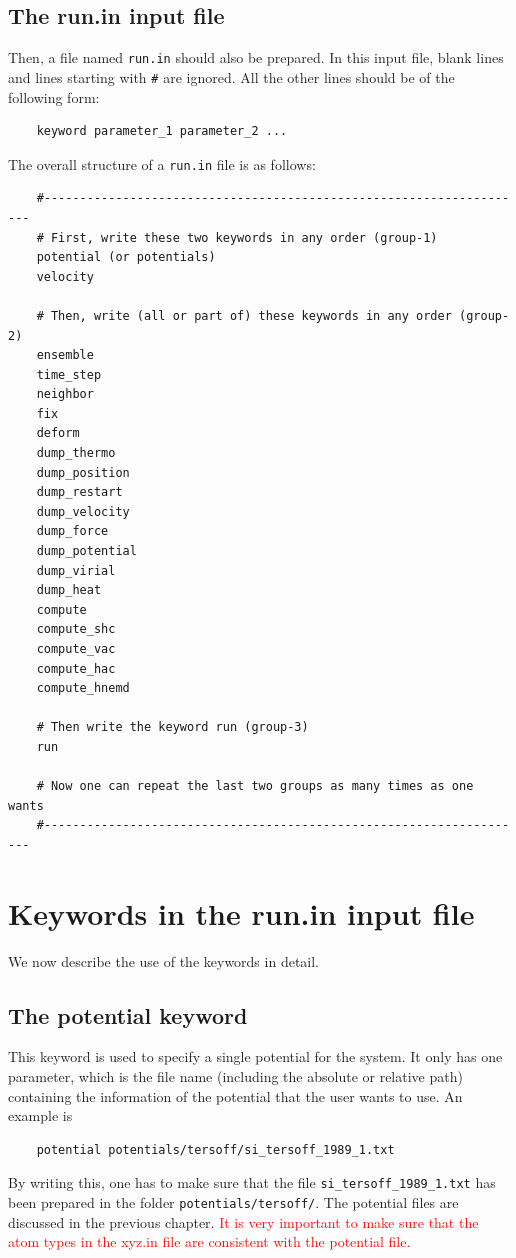 \documentclass[12pt,a4paper]{report}
\begin{document}
\subsection{The run.in input file}

Then, a file named \verb"run.in" should also be prepared. In this input file, blank lines and lines starting with \verb"#" are ignored. All the other lines should be of the following form:
\begin{verbatim}
    keyword parameter_1 parameter_2 ...
\end{verbatim}
The overall structure of a \verb"run.in" file is as follows:
\begin{verbatim}
    #--------------------------------------------------------------------
    # First, write these two keywords in any order (group-1)
    potential (or potentials)
    velocity

    # Then, write (all or part of) these keywords in any order (group-2)
    ensemble
    time_step
    neighbor
    fix
    deform
    dump_thermo
    dump_position
    dump_restart
    dump_velocity
    dump_force
    dump_potential
    dump_virial
    dump_heat
    compute
    compute_shc
    compute_vac
    compute_hac
    compute_hnemd

    # Then write the keyword run (group-3)
    run

    # Now one can repeat the last two groups as many times as one wants
    #--------------------------------------------------------------------
\end{verbatim}


\section{Keywords in the run.in input file}
We now describe the use of the keywords in detail.

\subsection{The potential keyword}

This keyword is used to specify a single potential for the system. It only has one parameter, which is the file name (including the absolute or relative path) containing the information of the potential that the user wants to use. An example is
\begin{verbatim}
    potential potentials/tersoff/si_tersoff_1989_1.txt
\end{verbatim}
By writing this, one has to make sure that the file \verb"si_tersoff_1989_1.txt" has been prepared in the folder \verb"potentials/tersoff/".
The potential files are discussed in the previous chapter. \textcolor{red}{It is very important to make sure that the atom types in the xyz.in file are consistent with the potential file.}
\end{document}
